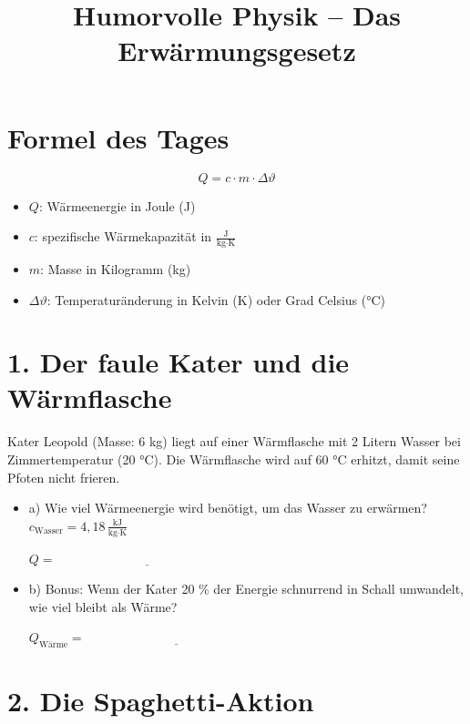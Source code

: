 \documentclass[a4paper]{article}
\begin{document}
\title{Humorvolle Physik – Das Erwärmungsgesetz}

	
	\section*{Formel des Tages}
	
	\[
	Q = c \cdot m \cdot \Delta \vartheta
	\]
	
	\begin{itemize}
		\item \( Q \): Wärmeenergie in Joule (J)
		\item \( c \): spezifische Wärmekapazität in \( \frac{\text{J}}{\text{kg} \cdot \text{K}} \)
		\item \( m \): Masse in Kilogramm (kg)
		\item \( \Delta \vartheta \): Temperaturänderung in Kelvin (K) oder Grad Celsius (°C)
	\end{itemize}
	
	\hrulefill
	
	\section*{1. Der faule Kater und die Wärmflasche}
	
Kater Leopold (Masse: 6 kg) liegt auf einer Wärmflasche mit 2 Litern Wasser bei Zimmertemperatur (20 °C). Die Wärmflasche wird auf 60 °C erhitzt, damit seine Pfoten nicht frieren.

	
	\begin{itemize}
		\item a) Wie viel Wärmeenergie wird benötigt, um das Wasser zu erwärmen?  
		\( c_\text{Wasser} = 4{,}18\,\frac{\text{kJ}}{\text{kg}\cdot\text{K}} \)
		
		\vspace{1em}
		\( Q = \underline{\hspace{6cm}} \)
		
		\item b) Bonus: Wenn der Kater 20 \% der Energie schnurrend in Schall umwandelt, wie viel bleibt als Wärme?
		
		\vspace{1em}
		\( Q_\text{Wärme} = \underline{\hspace{6cm}} \)
	\end{itemize}
	
	\hrulefill
	
	\section*{2. Die Spaghetti-Aktion }
	
\end{document}
